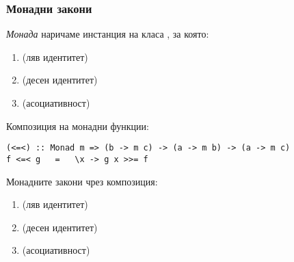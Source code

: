 \documentclass[alsotrans]{beamerswitch}
\begin{document}
\begin{frame}[fragile]
  \frametitle{Монадни закони}
  \begin{definition}
    \emph{Монада} наричаме инстанция на класа , за която:
    \begin{enumerate}[<+->]
    \item {} \eqv {} (ляв идентитет)
    \item {}   \eqv {}   (десен идентитет)
    \item {} \eqv {} (асоциативност)
    \end{enumerate}
  \end{definition}
  \onslide<+->
  Композиция на монадни функции:
\begin{lstlisting}
(<=<) :: Monad m => (b -> m c) -> (a -> m b) -> (a -> m c)  
f <=< g   =   \x -> g x >>= f
\end{lstlisting}
  \onslide<+->
  \vspace{-.5ex}
  Монадните закони чрез композиция:
  \begin{enumerate}
  \item {} \eqv {} (ляв идентитет)
  \item {} \eqv {} (десен идентитет)
  \item {} \eqv {} (асоциативност)
  \end{enumerate}
\end{frame}
\end{document}
